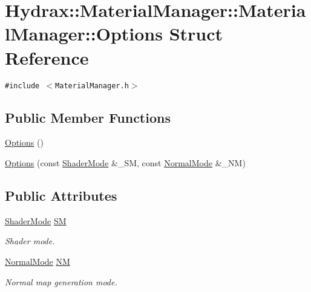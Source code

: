 \hypertarget{struct_hydrax_1_1_material_manager_1_1_options}{
\section{Hydrax::MaterialManager::MaterialManager::Options Struct Reference}
\label{struct_hydrax_1_1_material_manager_1_1_options}
}
{\tt \#include $<$MaterialManager.h$>$}

\subsection*{Public Member Functions}
\begin{CompactItemize}
\item 
\hyperlink{struct_hydrax_1_1_material_manager_1_1_options_2c1f6c31e864bf4e73cb3a2fe2e373b6}{Options} ()
\item 
\hyperlink{struct_hydrax_1_1_material_manager_1_1_options_af716f645ca8baf0228cfd411ba6bbda}{Options} (const \hyperlink{class_hydrax_1_1_material_manager_cb13fe494b6960a96270e1ac293c48fb}{ShaderMode} \&\_\-SM, const \hyperlink{class_hydrax_1_1_material_manager_aa14689cd1c259f48954dfecda9b296f}{NormalMode} \&\_\-NM)
\end{CompactItemize}
\subsection*{Public Attributes}
\begin{CompactItemize}
\item 
\hyperlink{class_hydrax_1_1_material_manager_cb13fe494b6960a96270e1ac293c48fb}{ShaderMode} \hyperlink{struct_hydrax_1_1_material_manager_1_1_options_4159e967b01acfb23b1f7103aacfd735}{SM}
\begin{CompactList}\small\item\em Shader mode. \item\end{CompactList}\item 
\hyperlink{class_hydrax_1_1_material_manager_aa14689cd1c259f48954dfecda9b296f}{NormalMode} \hyperlink{struct_hydrax_1_1_material_manager_1_1_options_e1c30e8d6b99933136f76904537aa758}{NM}
\begin{CompactList}\small\item\em Normal map generation mode. \item\end{CompactList}\end{CompactItemize}


